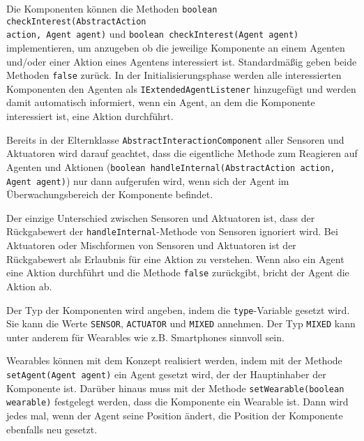 Die Komponenten können die Methoden \texttt{boolean checkInterest\-(AbstractAction\\
action, Agent agent)} und \texttt{boolean checkInterest(Agent agent)} implementieren, um anzugeben ob die jeweilige Komponente an einem Agenten und/oder einer Aktion eines Agentens interessiert ist. Standardmäßig geben beide Methoden \texttt{false} zurück. In der Initialisierungsphase werden alle interessierten Komponenten den Agenten als \texttt{IExtendedAgentListener} hinzugefügt und werden damit automatisch informiert, wenn ein Agent, an dem die Komponente interessiert ist, eine Aktion durchführt.

 Bereits in der Elternklasse \texttt{AbstractInteractionComponent} aller Sensoren und Aktuatoren wird darauf geachtet, dass die eigentliche Methode zum Reagieren auf Agenten und Aktionen (\texttt{boolean handleInternal(AbstractAction action, Agent agent)}) nur dann aufgerufen wird, wenn sich der Agent im Überwachungsbereich der Komponente befindet.

Der einzige Unterschied zwischen Sensoren und Aktuatoren ist, dass der Rückgabewert der \texttt{handle\-Internal}-Methode von Sensoren ignoriert wird. Bei Aktuatoren oder Mischformen von Sensoren und Aktuatoren ist der Rückgabewert als Erlaubnis für eine Aktion zu verstehen. Wenn also ein Agent eine Aktion durchführt und die Methode \texttt{false} zurückgibt, bricht der Agent die Aktion ab.

Der Typ der Komponenten wird angeben, indem die \texttt{type}-Variable gesetzt wird. Sie kann die Werte \texttt{SENSOR}, \texttt{ACTUATOR} und \texttt{MIXED} annehmen. Der Typ \texttt{MIXED} kann unter anderem für Wearables wie z.B. Smartphones sinnvoll sein.

Wearables können mit dem Konzept realisiert werden, indem mit der Methode \texttt{setAgent(Agent agent)} ein Agent gesetzt wird, der der Hauptinhaber der Komponente ist. Darüber hinaus muss mit der Methode \texttt{setWearable(boolean wearable)} festgelegt werden, dass die Komponente ein Wearable ist. Dann wird jedes mal, wenn der Agent seine Position ändert, die Position der Komponente ebenfalls neu gesetzt.
